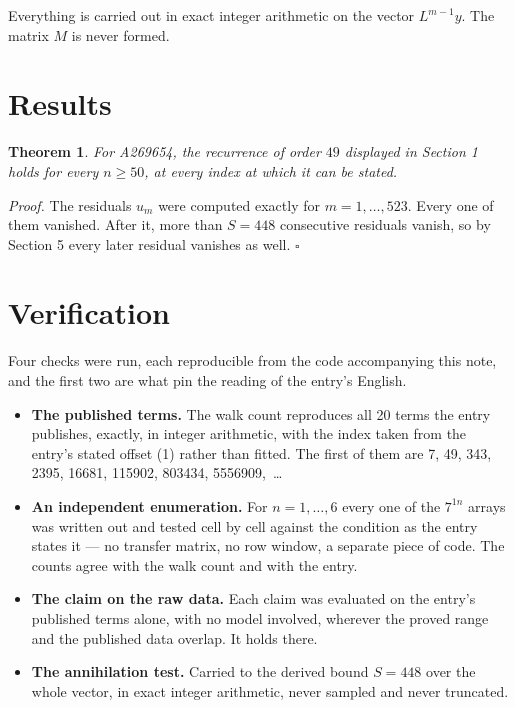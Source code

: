 \documentclass[11pt]{article}
\newtheorem{theorem}{Theorem}
\theoremstyle{definition}
\begin{document}
Everything is carried out in exact integer arithmetic on the vector $L^{m-1}y$. The matrix $M$ is never formed.

\section{Results}

\begin{theorem} For A269654, the recurrence of order $49$ displayed in Section 1 holds for every $n \ge 50$, at every index at which it can be stated.\end{theorem}

{\itshape Proof.} The residuals $u_m$ were computed exactly for $m = 1,\dots,523$. Every one of them vanished. After it, more than $S = 448$ consecutive residuals vanish, so by Section 5 every later residual vanishes as well. $\square$

\section{Verification}

Four checks were run, each reproducible from the code accompanying this note, and the first two are what pin the reading of the entry's English.

\begin{itemize}

\item {\bfseries The published terms.} The walk count reproduces all 20 terms the entry publishes, exactly, in integer arithmetic, with the index taken from the entry's stated offset (1) rather than fitted. The first of them are 7, 49, 343, 2395, 16681, 115902, 803434, 5556909,~\dots

\item {\bfseries An independent enumeration.} For $n = 1,\dots,6$ every one of the $7^{1n}$ arrays was written out and tested cell by cell against the condition as the entry states it --- no transfer matrix, no row window, a separate piece of code. The counts agree with the walk count and with the entry.

\item {\bfseries The claim on the raw data.} Each claim was evaluated on the entry's published terms alone, with no model involved, wherever the proved range and the published data overlap. It holds there.

\item {\bfseries The annihilation test.} Carried to the derived bound $S = 448$ over the whole vector, in exact integer arithmetic, never sampled and never truncated.

\end{itemize}
\end{document}
